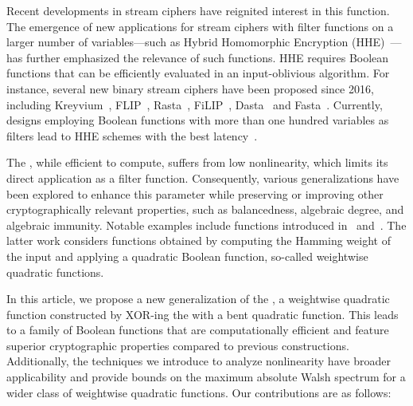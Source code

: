 \documentclass{llncs}
\begin{document}
Recent developments in stream ciphers have reignited interest in this function. The emergence of new applications for stream ciphers with filter functions on a larger number of variables—such as Hybrid Homomorphic Encryption (\textsf{HHE})~\cite{CCS:NaeLauVai11}—has further emphasized the relevance of such functions. \textsf{HHE} requires Boolean functions that can be efficiently evaluated in an input-oblivious algorithm. For instance, several new binary stream ciphers have been proposed since 2016, including Kreyvium~\cite{JOC:CCFLNP18}, \textsf{FLIP}~\cite{EC:MJSC16}, Rasta~\cite{C:Rasta}, \textsf{FiLIP}~\cite{INDO:MCJS19}, Dasta~\cite{TOSC:BeiLea20} and Fasta~\cite{CTRSA:CidIndRad22}. Currently, designs employing Boolean functions with more than one hundred variables as filters lead to \textsf{HHE} schemes with the best latency~\cite{INDO:HofMeaRic20,CCS:CDPP22,CIC:MeaParPei24,eprint:AGHM24}.

The \hwbf{}, while efficient to compute, suffers from low nonlinearity, which limits its direct application as a filter function. Consequently, various generalizations have been explored to enhance this parameter while preserving or improving other cryptographically relevant properties, such as balancedness, algebraic degree, and algebraic immunity. Notable examples include functions introduced in~\cite{IEEE:Carlet22,eprint:CarPar23} and~\cite{DAM:MeaOza24}. The latter work considers functions obtained by computing the Hamming weight of the input and applying a quadratic Boolean function, so-called weightwise quadratic functions.

\bigskip

In this article, we propose a new generalization of the \hwbf{}, a weightwise quadratic function constructed by \textsf{XOR}-ing the \hwbf{} with a bent quadratic function. This leads to a family of Boolean functions that are computationally efficient and feature superior cryptographic properties compared to previous constructions. Additionally, the techniques we introduce to analyze nonlinearity have broader applicability and provide bounds on the maximum absolute Walsh spectrum for a wider class of weightwise quadratic functions. Our contributions are as follows:
\end{document}
